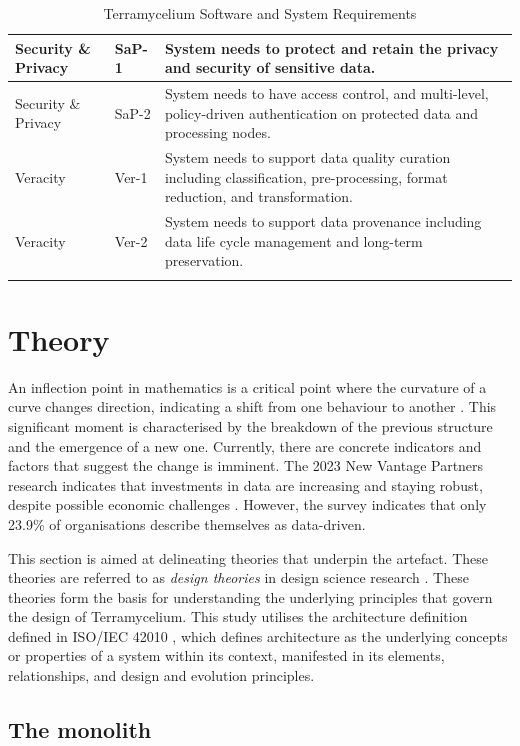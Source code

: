 \documentclass[preprint,12pt]{elsarticle}
\begin{document}
\begin{longtable}{|p{2cm}|p{1cm}|p{9cm}|}
    \hline
    Security \& Privacy & SaP-1 & System needs to protect and retain the privacy and security of sensitive data. \\
    \hline
    Security \& Privacy & SaP-2 & System needs to have access control, and multi-level, policy-driven authentication on protected data and processing nodes. \\
    \hline
    Veracity & Ver-1 & System needs to support data quality curation including classification, pre-processing, format reduction, and transformation. \\
    \hline
    Veracity & Ver-2 & System needs to support data provenance including data life cycle management and long-term preservation. \\
    \hline
    \caption{Terramycelium Software and System Requirements}
    \label{table:systemRequirements}
\end{longtable}

\section{Theory}

\label{sec:theory}

An inflection point in mathematics is a critical point where the curvature of a curve changes direction, indicating a shift from one behaviour to another \cite{inflectionPoint}. This significant moment is characterised by the breakdown of the previous structure and the emergence of a new one. Currently, there are concrete indicators and factors that suggest the change is imminent. The 2023 New Vantage Partners research indicates that investments in data are increasing and staying robust, despite possible economic challenges \cite{newvantagepartners2023}. However, the survey indicates that only 23.9\% of organisations describe themselves as data-driven. 

This section is aimed at delineating theories that underpin the artefact. These theories are referred to as \emph{design theories} in design science research \cite{Rose}. These theories form the basis for understanding the underlying principles that govern the design of Terramycelium. This study utilises the architecture definition defined in ISO/IEC 42010 \cite{ISO42010}, which defines architecture as the underlying concepts or properties of a system within its context, manifested in its elements, relationships, and design and evolution principles.

\subsection{The monolith}
\end{document}
